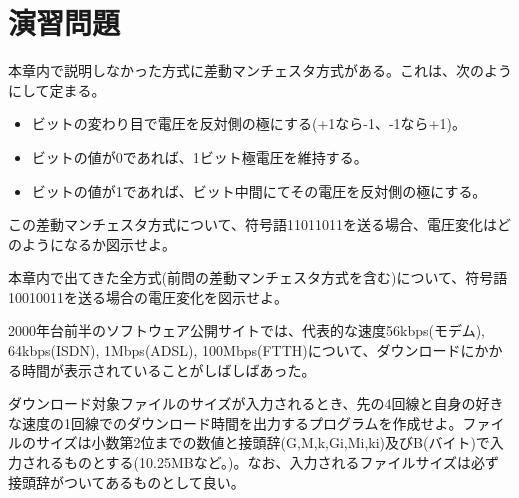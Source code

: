 \section*{演習問題}
\begin{problems}
\item 本章内で説明しなかった方式に差動マンチェスタ方式がある。これは、次のようにして定まる。
\begin{itemize}
\item ビットの変わり目で電圧を反対側の極にする(+1なら-1、-1なら+1)。
\item ビットの値が0であれば、1ビット極電圧を維持する。
\item ビットの値が1であれば、ビット中間にてその電圧を反対側の極にする。
\end{itemize}
この差動マンチェスタ方式について、符号語11011011を送る場合、電圧変化はどのようになるか図示せよ。

\item 本章内で出てきた全方式(前問の差動マンチェスタ方式を含む)について、符号語10010011を送る場合の電圧変化を図示せよ。

\item 2000年台前半のソフトウェア公開サイトでは、代表的な速度56kbps(モデム), 64kbps(ISDN), 1Mbps(ADSL), 100Mbps(FTTH)について、ダウンロードにかかる時間が表示されていることがしばしばあった。

ダウンロード対象ファイルのサイズが入力されるとき、先の4回線と自身の好きな速度の1回線でのダウンロード時間を出力するプログラムを作成せよ。ファイルのサイズは小数第2位までの数値と接頭辞(G,M,k,Gi,Mi,ki)及びB(バイト)で入力されるものとする(10.25MBなど。)。なお、入力されるファイルサイズは必ず接頭辞がついてあるものとして良い。

\end{problems}
